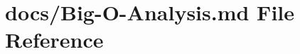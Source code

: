 \hypertarget{_big-_o-_analysis_8md}{}\section{docs/\+Big-\/\+O-\/\+Analysis.md File Reference}
\label{_big-_o-_analysis_8md}

